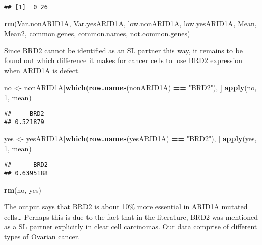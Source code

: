 \documentclass[]{article}
\newenvironment{Shaded}{\begin{snugshade}}{\end{snugshade}}
\newcommand{\DecValTok}[1]{\textcolor[rgb]{0.00,0.00,0.81}{#1}}
\newcommand{\KeywordTok}[1]{\textcolor[rgb]{0.13,0.29,0.53}{\textbf{#1}}}
\newcommand{\NormalTok}[1]{#1}
\newcommand{\OperatorTok}[1]{\textcolor[rgb]{0.81,0.36,0.00}{\textbf{#1}}}
\newcommand{\StringTok}[1]{\textcolor[rgb]{0.31,0.60,0.02}{#1}}
\begin{document}
\begin{verbatim}
## [1]  0 26
\end{verbatim}

\begin{Shaded}
\begin{Highlighting}[]
\KeywordTok{rm}\NormalTok{(Var.nonARID1A, Var.yesARID1A, low.nonARID1A, low.yesARID1A, Mean, Mean2, common.genes, common.names, not.common.genes)}
\end{Highlighting}
\end{Shaded}

Since BRD2 cannot be identified as an SL partner this way, it remains to
be found out which difference it makes for cancer cells to lose BRD2
expression when ARID1A is defect.

\begin{Shaded}
\begin{Highlighting}[]
\NormalTok{no <-}\StringTok{ }\NormalTok{nonARID1A[}\KeywordTok{which}\NormalTok{(}\KeywordTok{row.names}\NormalTok{(nonARID1A) }\OperatorTok{==}\StringTok{ "BRD2"}\NormalTok{), ]}
\KeywordTok{apply}\NormalTok{(no, }\DecValTok{1}\NormalTok{, mean)}
\end{Highlighting}
\end{Shaded}

\begin{verbatim}
##     BRD2 
## 0.521879
\end{verbatim}

\begin{Shaded}
\begin{Highlighting}[]
\NormalTok{yes <-}\StringTok{ }\NormalTok{yesARID1A[}\KeywordTok{which}\NormalTok{(}\KeywordTok{row.names}\NormalTok{(yesARID1A) }\OperatorTok{==}\StringTok{ "BRD2"}\NormalTok{), ]}
\KeywordTok{apply}\NormalTok{(yes, }\DecValTok{1}\NormalTok{, mean)}
\end{Highlighting}
\end{Shaded}

\begin{verbatim}
##      BRD2 
## 0.6395188
\end{verbatim}

\begin{Shaded}
\begin{Highlighting}[]
\KeywordTok{rm}\NormalTok{(no, yes)}
\end{Highlighting}
\end{Shaded}

The output says that BRD2 is about 10\% more essential in ARID1A mutated
cells\ldots{} Perhaps this is due to the fact that in the literature,
BRD2 was mentioned as a SL partner explicitly in clear cell carcinomas.
Our data comprise of different types of Ovarian cancer.
\end{document}
